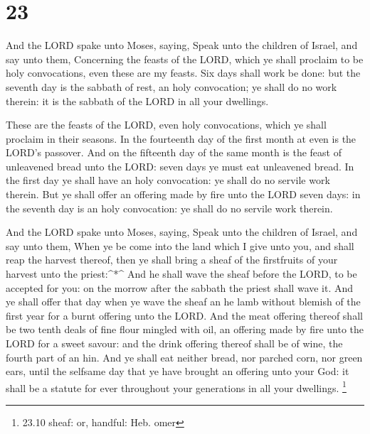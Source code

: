 \hypertarget{section-22}{%
\section{23}\label{section-22}}

 And the LORD spake unto Moses, saying,  Speak
unto the children of Israel, and say unto them, Concerning the feasts of
the LORD, which ye shall proclaim to be holy convocations, even these
are my feasts.  Six days shall work be done: but the seventh
day is the sabbath of rest, an holy convocation; ye shall do no work
therein: it is the sabbath of the LORD in all your dwellings.

 These are the feasts of the LORD, even holy convocations,
which ye shall proclaim in their seasons.  In the fourteenth
day of the first month at even is the LORD's passover.  And
on the fifteenth day of the same month is the feast of unleavened bread
unto the LORD: seven days ye must eat unleavened bread.  In
the first day ye shall have an holy convocation: ye shall do no servile
work therein.  But ye shall offer an offering made by fire
unto the LORD seven days: in the seventh day is an holy convocation: ye
shall do no servile work therein.

 And the LORD spake unto Moses, saying,  Speak
unto the children of Israel, and say unto them, When ye be come into the
land which I give unto you, and shall reap the harvest thereof, then ye
shall bring a sheaf of the firstfruits of your harvest unto the
priest:\^{}*\^{}  And he shall wave the sheaf before the
LORD, to be accepted for you: on the morrow after the sabbath the priest
shall wave it.  And ye shall offer that day when ye wave
the sheaf an he lamb without blemish of the first year for a burnt
offering unto the LORD.  And the meat offering thereof
shall be two tenth deals of fine flour mingled with oil, an offering
made by fire unto the LORD for a sweet savour: and the drink offering
thereof shall be of wine, the fourth part of an hin.  And
ye shall eat neither bread, nor parched corn, nor green ears, until the
selfsame day that ye have brought an offering unto your God: it shall be
a statute for ever throughout your generations in all your dwellings.
\footnote{23.10 sheaf: or, handful: Heb. omer}

